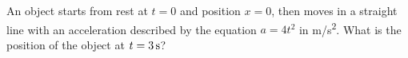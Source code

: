 \documentclass{../../oss-apphys-exam}
\begin{document}
\begin{multicols*}{2}
\begin{questions}
%  
%    

    \question An object starts from rest at $t=0$ and position $x=0$, then moves
    in a straight line with an acceleration described by the equation $a=4t^2$
    in \si{m/s^2}. What is the position of the object at $t=\SI3\second$?
    \columnbreak
    

\end{questions}
\end{multicols*}
\end{document}
